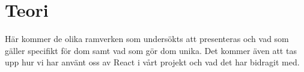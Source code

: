 \section{Teori}
\label{sec:axel-theory}

Här kommer de olika ramverken som undersökts att presenteras och vad som gäller specifikt för dom samt vad som gör dom unika. Det kommer även att tas upp hur vi har använt oss av React i vårt projekt och vad det har bidragit med. 
